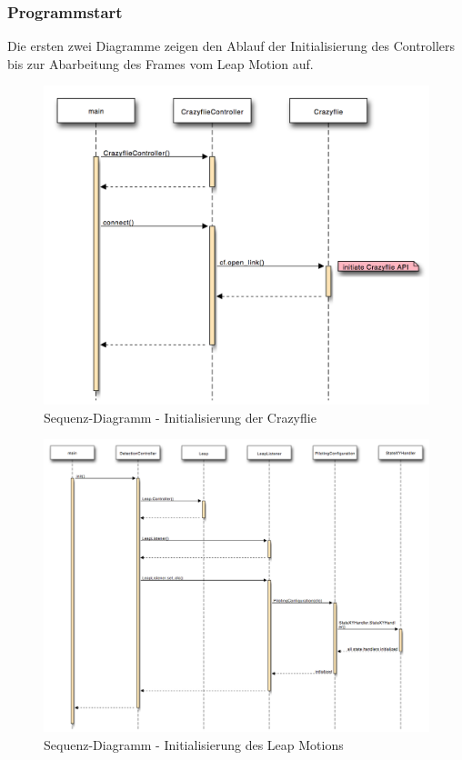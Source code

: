 \subsubsection{Programmstart}
Die ersten zwei Diagramme zeigen den Ablauf der Initialisierung des Controllers bis zur Abarbeitung des Frames vom Leap Motion auf.
\begin{figure}[H]
	\centering
	\includegraphics[width=1.0\textwidth]{figures/poc/seq_dia_crazyflie.png}
	\caption{Sequenz-Diagramm - Initialisierung der Crazyflie}
\end{figure}

%	


\begin{figure}
	\includegraphics[width=1.0\textwidth]{figures/poc/seq_dia_detection_part1.png}
	\caption{Sequenz-Diagramm - Initialisierung des Leap Motions}
\end{figure}

